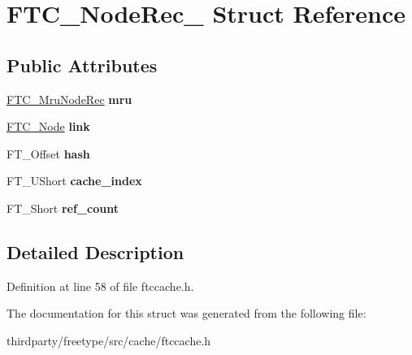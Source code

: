 \hypertarget{struct_f_t_c___node_rec__}{}\section{F\+T\+C\+\_\+\+Node\+Rec\+\_\+ Struct Reference}
\label{struct_f_t_c___node_rec__}
\subsection*{Public Attributes}
\begin{DoxyCompactItemize}
\item 
\mbox{\label{struct_f_t_c___node_rec___a7f9932dc47974390275594671ac70493}} 
\hyperlink{struct_f_t_c___mru_node_rec__}{F\+T\+C\+\_\+\+Mru\+Node\+Rec} {\bfseries mru}
\item 
\mbox{\label{struct_f_t_c___node_rec___a90db883e43107186580ebb85e46e9af2}} 
\hyperlink{struct_f_t_c___node_rec__}{F\+T\+C\+\_\+\+Node} {\bfseries link}
\item 
\mbox{\label{struct_f_t_c___node_rec___a39bd25efa6b88e8652abdc57e7b5a5e9}} 
F\+T\+\_\+\+Offset {\bfseries hash}
\item 
\mbox{\label{struct_f_t_c___node_rec___afff5b09105bf92c284ba9e91fd00ad8e}} 
F\+T\+\_\+\+U\+Short {\bfseries cache\+\_\+index}
\item 
\mbox{\label{struct_f_t_c___node_rec___a30ba3878a09ce276f9d804ed9451cdcb}} 
F\+T\+\_\+\+Short {\bfseries ref\+\_\+count}
\end{DoxyCompactItemize}


\subsection{Detailed Description}


Definition at line 58 of file ftccache.\+h.



The documentation for this struct was generated from the following file\+:\begin{DoxyCompactItemize}
\item 
thirdparty/freetype/src/cache/ftccache.\+h\end{DoxyCompactItemize}
